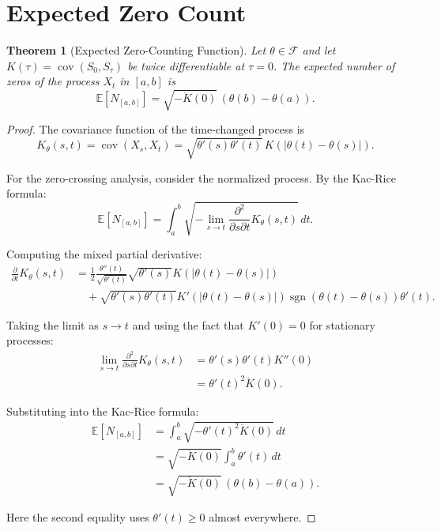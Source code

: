 \documentclass[11pt]{article}
\newtheorem{theorem}{Theorem}
\begin{document}
\section{Expected Zero Count}\label{sec:zero_count}

\begin{theorem}[Expected Zero-Counting Function]\label{thm:zero_count}
Let $\theta\in\mathcal{F}$ and let $K(\tau) = \operatorname{cov}(S_0, S_\tau)$ be twice differentiable at $\tau=0$. The expected number of zeros of the process $X_t$ in $[a,b]$ is
\begin{equation}\label{eq:zero_count}
    \mathbb{E}[N_{[a,b]}] = \sqrt{-\ddot{K}(0)}\,(\theta(b)-\theta(a)).
\end{equation}
\end{theorem}

\begin{proof}
The covariance function of the time-changed process is
\begin{equation}\label{eq:time_changed_cov}
    K_\theta(s,t) = \operatorname{cov}(X_s, X_t) = \sqrt{\theta'(s)\theta'(t)}\,K(|\theta(t)-\theta(s)|).
\end{equation}

For the zero-crossing analysis, consider the normalized process. By the Kac-Rice formula:
\begin{equation}\label{eq:kac_rice}
    \mathbb{E}[N_{[a,b]}] = \int_a^b \sqrt{-\lim_{s\to t}\frac{\partial^2}{\partial s\partial t}K_\theta(s,t)}\,dt.
\end{equation}

Computing the mixed partial derivative:
\begin{align}
    \frac{\partial}{\partial t}K_\theta(s,t) &= \frac{1}{2}\frac{\theta''(t)}{\sqrt{\theta'(t)}}\sqrt{\theta'(s)}K(|\theta(t)-\theta(s)|)\\
    &\quad + \sqrt{\theta'(s)\theta'(t)}K'(|\theta(t)-\theta(s)|)\operatorname{sgn}(\theta(t)-\theta(s))\theta'(t).
\end{align}

Taking the limit as $s\to t$ and using the fact that $K'(0) = 0$ for stationary processes:
\begin{align}
    \lim_{s\to t}\frac{\partial^2}{\partial s\partial t}K_\theta(s,t) &= \theta'(s)\theta'(t)K''(0)\\
    &= \theta'(t)^2\ddot{K}(0).
\end{align}

Substituting into the Kac-Rice formula:
\begin{align}
    \mathbb{E}[N_{[a,b]}] &= \int_a^b \sqrt{-\theta'(t)^2\ddot{K}(0)}\,dt\\
    &= \sqrt{-\ddot{K}(0)}\int_a^b \theta'(t)\,dt\\
    &= \sqrt{-\ddot{K}(0)}\,(\theta(b)-\theta(a)).
\end{align}

Here the second equality uses $\theta'(t) \geq 0$ almost everywhere.
\end{proof}
\end{document}
